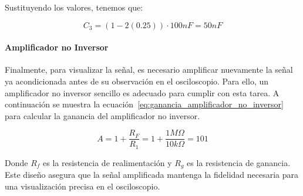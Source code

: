                     Sustituyendo los valores, tenemos que:

                    \begin{equation}
                        C_3 = (1 - 2(0.25)) \cdot 100 nF = 50 nF
                    \end{equation}

            \paragraph{Amplificador no Inversor}
                Finalmente, para visualizar la señal, es necesario amplificar nuevamente la señal ya acondicionada antes de su observación en el osciloscopio. Para ello, un amplificador no inversor sencillo es adecuado para cumplir con esta tarea. A continuación se muestra la ecuación~\ref{eq:ganancia_amplificador_no_inversor} para calcular la ganancia del amplificador no inversor.

                \begin{equation}
                    \label{eq:ganancia_amplificador_no_inversor}
                    A = 1 + \frac{R_F}{R_{1}} = 1 + \frac{1 M\Omega}{10 k\Omega} = 101
                \end{equation}

                Donde $R_f$ es la resistencia de realimentación y $R_g$ es la resistencia de ganancia. Este diseño asegura que la señal amplificada mantenga la fidelidad necesaria para una visualización precisa en el osciloscopio.


            